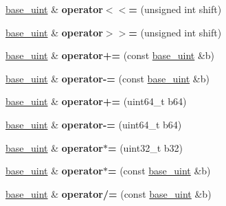 \begin{DoxyCompactItemize}
\mbox{\label{classbase__uint_a57a2942a101cdb2e028b3f5b7520110d}} 
\mbox{\hyperlink{classbase__uint}{base\+\_\+uint}} \& {\bfseries operator$<$$<$=} (unsigned int shift)
\item 
\mbox{\label{classbase__uint_a37ed8249249c75a860c809b9b58a478b}} 
\mbox{\hyperlink{classbase__uint}{base\+\_\+uint}} \& {\bfseries operator$>$$>$=} (unsigned int shift)
\item 
\mbox{\label{classbase__uint_a8fb3109e7c46536bb66ac41242176246}} 
\mbox{\hyperlink{classbase__uint}{base\+\_\+uint}} \& {\bfseries operator+=} (const \mbox{\hyperlink{classbase__uint}{base\+\_\+uint}} \&b)
\item 
\mbox{\label{classbase__uint_a89d8332840076ec102839b8a10dda9b4}} 
\mbox{\hyperlink{classbase__uint}{base\+\_\+uint}} \& {\bfseries operator-\/=} (const \mbox{\hyperlink{classbase__uint}{base\+\_\+uint}} \&b)
\item 
\mbox{\label{classbase__uint_a14f2b12970b3198d65abafb2615207ca}} 
\mbox{\hyperlink{classbase__uint}{base\+\_\+uint}} \& {\bfseries operator+=} (uint64\+\_\+t b64)
\item 
\mbox{\label{classbase__uint_ab64f7a7a87b9af5ea345e4678b4cc1e9}} 
\mbox{\hyperlink{classbase__uint}{base\+\_\+uint}} \& {\bfseries operator-\/=} (uint64\+\_\+t b64)
\item 
\mbox{\label{classbase__uint_adf6f78e1043a4191205337c875b82a09}} 
\mbox{\hyperlink{classbase__uint}{base\+\_\+uint}} \& {\bfseries operator$\ast$=} (uint32\+\_\+t b32)
\item 
\mbox{\label{classbase__uint_a92ac543f4dd5e0de9d43085ff43225e1}} 
\mbox{\hyperlink{classbase__uint}{base\+\_\+uint}} \& {\bfseries operator$\ast$=} (const \mbox{\hyperlink{classbase__uint}{base\+\_\+uint}} \&b)
\item 
\mbox{\label{classbase__uint_a81e131ae767e0e606c0748d69d04316e}} 
\mbox{\hyperlink{classbase__uint}{base\+\_\+uint}} \& {\bfseries operator/=} (const \mbox{\hyperlink{classbase__uint}{base\+\_\+uint}} \&b)

\end{DoxyCompactItemize}
